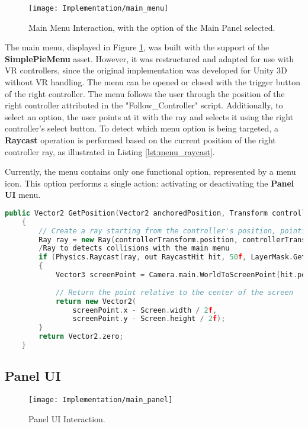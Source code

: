  \begin{figure}[h!]
    \centering
    \texttt{[image: Implementation/main\_menu]}
    \caption{Main Menu Interaction, with the option of the Main Panel selected.}
    \label{fig:main_menu}
\end{figure}

The main menu, displayed in Figure \ref{fig:main_menu}, was built with the support of the \textbf{SimplePieMenu} asset.
However, it was restructured and adapted for use with \gls{VR} controllers, since the original implementation was developed for Unity \gls{3D} without \gls{VR} handling.
The menu can be opened or closed with the trigger button of the right controller. The menu follows the user through the position of the right controller attributed in the "Follow\_Controller" script.
Additionally, to select an option, the user points at it with the ray and selects it using the right controller’s select button. To detect which menu option is being targeted, a \textbf{Raycast} operation is performed based on the current position of the right controller ray, as illustrated in Listing \ref{lst:menu_raycast}.

Currently, the menu contains only one functional option, represented by a menu icon. This option performs a single action: activating or deactivating the \textbf{Panel \gls{UI}} menu.


\begin{lstlisting}[language=C++, caption={Method used to acquire the position that was pointed at by the controller ray.}, label={lst:menu_raycast},float]
    public Vector2 GetPosition(Vector2 anchoredPosition, Transform controllerTransform)
    {
        // Create a ray starting from the controller's position, pointing forward
        Ray ray = new Ray(controllerTransform.position, controllerTransform.forward);
        /Ray to detects collisions with the main menu
        if (Physics.Raycast(ray, out RaycastHit hit, 50f, LayerMask.GetMask("Default")))
        {
            Vector3 screenPoint = Camera.main.WorldToScreenPoint(hit.point);
            
            // Return the point relative to the center of the screen
            return new Vector2(
                screenPoint.x - Screen.width / 2f,
                screenPoint.y - Screen.height / 2f);
        }
        return Vector2.zero;
    }
\end{lstlisting}



\subsection{Panel \gls{UI}}
\label{sec:panel_UI}
\begin{figure}[h!]
    \centering
    \texttt{[image: Implementation/main\_panel]}
    \caption{Panel \gls{UI} Interaction.}
    \label{fig:main_panel}    
\end{figure}


